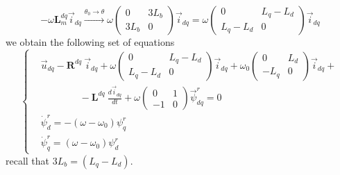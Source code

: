 \documentclass[12pt,a4paper]{scrartcl}
\begin{document}
\begin{onehalfspace}
$$-\omega\mathbf{L}_m^{dq}\vec{i}_{dq}
\xrightarrow{\theta_0\rightarrow\theta} \omega\begin{pmatrix} 0 & 3L_b\\ 3L_b & 0 \end{pmatrix}\vec{i}_{dq} = \omega\begin{pmatrix} 0 & L_q-L_d\\ L_q-L_d & 0 \end{pmatrix}\vec{i}_{dq}$$
we obtain the following set of equations  
\begin{equation}\label{eqdq}
	\left\lbrace \begin{aligned}
		& \vec{u}_{dq}-\mathbf{R}^{dq}\ \vec{i}_{dq} + \omega\begin{pmatrix} 0 & L_q-L_d\\ L_q-L_d & 0 \end{pmatrix}\vec{i}_{dq} + \omega_0\begin{pmatrix} 0 & L_d\\ -L_q & 0 \end{pmatrix}\vec{i}_{dq} + \\[6pt]
		&\qquad\qquad-\mathbf{L}^{dq}\ \frac{d\vec{i}_{dq}}{dt} + \omega\begin{pmatrix} 0 & 1\\-1 & 0 \end{pmatrix}\vec{\psi}_{dq}^r = 0\\[6pt]
		& \dot{\psi}_d^r = -\left( \omega-\omega_0\right)\psi_q^r \\[6pt]
		&\dot{\psi}_q^r = \left( \omega-\omega_0\right)\psi_d^r 
	\end{aligned} \right. 
\end{equation}
recall that $3L_b=(L_q-L_d)$.


\end{onehalfspace}
\end{document}
